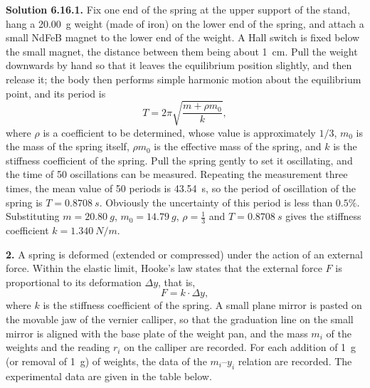 \medskip
\noindent\textbf{Solution 6.16.}\quad \textbf{1.} Fix one end of the spring at the upper support of the stand, hang a \SI{20.00}{g} weight (made of iron) on the lower end of the spring, and attach a small NdFeB magnet to the lower end of the weight. A Hall switch is fixed below the small magnet, the distance between them being about \SI{1}{cm}. Pull the weight downwards by hand so that it leaves the equilibrium position slightly, and then release it; the body then performs simple harmonic motion about the equilibrium point, and its period is
\begin{equation}\tag{1}
T=2\pi\sqrt{\frac{m+\rho m_0}{k}},
\end{equation}
where $\rho$ is a coefficient to be determined, whose value is approximately $1/3$, $m_0$ is the mass of the spring itself, $\rho m_0$ is the effective mass of the spring, and $k$ is the stiffness coefficient of the spring. Pull the spring gently to set it oscillating, and the time of 50 oscillations can be measured. Repeating the measurement three times, the mean value of 50 periods is \SI{43.54}{s}, so the period of oscillation of the spring is $T=\SI{0.8708}{s}$. Obviously the uncertainty of this period is less than $0.5\%$. Substituting $m=\SI{20.80}{g}$, $m_0=\SI{14.79}{g}$, $\rho=\frac{1}{3}$ and $T=\SI{0.8708}{s}$ gives the stiffness coefficient $k=\SI{1.340}{N/m}$.

\textbf{2.} A spring is deformed (extended or compressed) under the action of an external force. Within the elastic limit, Hooke's law states that the external force $F$ is proportional to its deformation $\Delta y$, that is,
\begin{equation}\tag{2}
F=k\cdot\Delta y,
\end{equation}
where $k$ is the stiffness coefficient of the spring. A small plane mirror is pasted on the movable jaw of the vernier calliper, so that the graduation line on the small mirror is aligned with the base plate of the weight pan, and the mass $m_i$ of the weights and the reading $r_i$ on the calliper are recorded. For each addition of \SI{1}{g} (or removal of \SI{1}{g}) of weights, the data of the $m_i$--$y_i$ relation are recorded. The experimental data are given in the table below.

